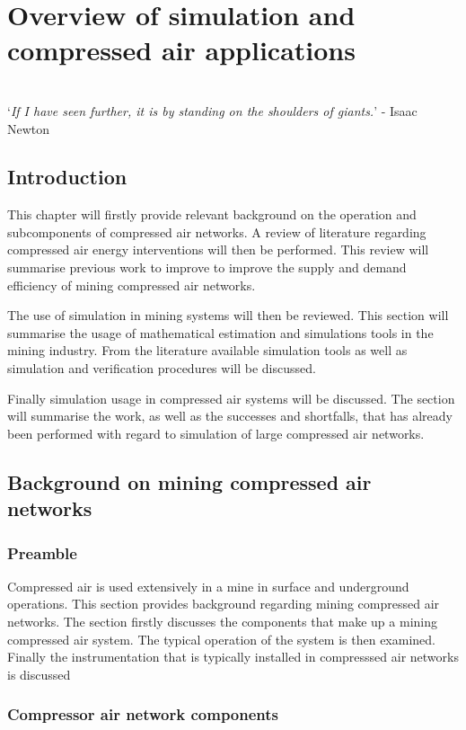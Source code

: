 \chapter{Overview of simulation and compressed air applications}
\label{Chap2}
\thispagestyle{empty}
\vspace{38em}
\hrulefill
\\
\enquote*{\textit{If I have seen further, it is by standing on the shoulders of giants.}} - Isaac Newton\\
\clearpage
\section{Introduction}
 This chapter will firstly provide relevant background on the operation and subcomponents of compressed air networks. A review of literature regarding compressed air energy interventions will then be performed. This review will summarise previous work to improve to improve the supply and demand efficiency of mining compressed air networks.
\par
The use of simulation in mining systems will then be reviewed. This section will summarise the usage of mathematical estimation and simulations tools in the mining industry. From the literature available simulation tools as well as simulation and verification procedures will be discussed.
\par
Finally simulation usage in compressed air systems will be discussed. The section will summarise the work, as well as the successes and shortfalls, that has already been performed with regard to simulation of large compressed air networks.
\section{Background on mining compressed air networks}
\subsection{Preamble}
Compressed air is used extensively in a mine in surface and underground operations. This section provides background regarding mining compressed air networks. The section firstly discusses the components that make up a mining compressed air system. The typical operation of the system is then examined. Finally the instrumentation that is typically installed in compresssed air networks is discussed
\subsection{Compressor air network components}
